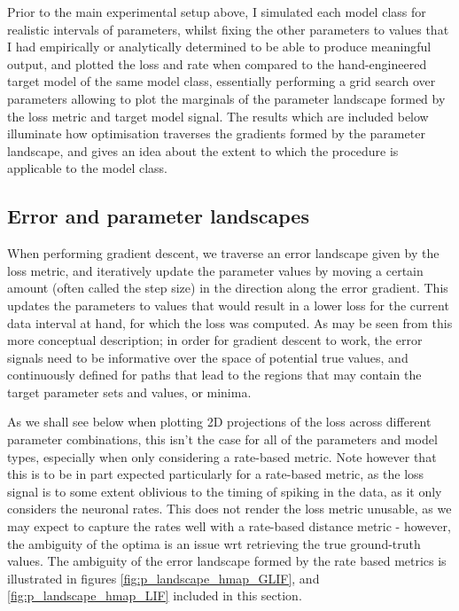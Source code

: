 \documentclass[mphil,deptreport,ianc]{infthesis} %
\begin{document}
Prior to the main experimental setup above, I simulated each model class for realistic intervals of parameters, whilst fixing the other parameters to values that I had empirically or analytically determined to be able to produce meaningful output, and plotted the loss and rate when compared to the hand-engineered target model of the same model class, essentially performing a grid search over parameters allowing to plot the marginals of the parameter landscape formed by the loss metric and target model signal.
The results which are included below illuminate how optimisation traverses the gradients formed by the parameter landscape, and gives an idea about the extent to which the procedure is applicable to the model class.


\subsection{Error and parameter landscapes}\label{sect:e_landscapes}

When performing gradient descent, we traverse an error landscape given by the loss metric, and iteratively update the parameter values by moving a certain amount (often called the step size) in the direction along the error gradient. 
This updates the parameters to values that would result in a lower loss for the current data interval at hand, for which the loss was computed.
As may be seen from this more conceptual description; in order for gradient descent to work, the error signals need to be informative over the space of potential true values, and continuously defined for paths that lead to the regions that may contain the target parameter sets and values, or minima.

As we shall see below when plotting 2D projections of the loss across different parameter combinations, this isn't the case for all of the parameters and model types, especially when only considering a rate-based metric.
Note however that this is to be in part expected particularly for a rate-based metric, as the loss signal is to some extent oblivious to the timing of spiking in the data, as it only considers the neuronal rates.
This does not render the loss metric unusable, as we may expect to capture the rates well with a rate-based distance metric - however, the ambiguity of the optima is an issue wrt retrieving the true ground-truth values.
The ambiguity of the error landscape formed by the rate based metrics is illustrated in figures \ref{fig:p_landscape_hmap_GLIF}, and \ref{fig:p_landscape_hmap_LIF} included in this section.
\end{document}
